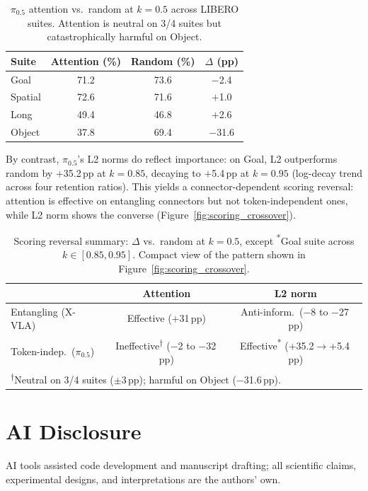 \begin{table}[ht]
\centering
\small
\caption{$\pi_{0.5}$ attention vs.\ random at $k{=}0.5$ across LIBERO suites. Attention is neutral on 3/4 suites but catastrophically harmful on Object.}
\label{tab:pi05_attention_crosssuite}
\begin{tabular}{lccc}
\toprule
Suite & Attention (\%) & Random (\%) & $\Delta$ (pp) \\
\midrule
Goal & 71.2 & 73.6 & $-$2.4 \\
Spatial & 72.6 & 71.6 & $+$1.0 \\
Long & 49.4 & 46.8 & $+$2.6 \\
Object & 37.8 & 69.4 & $-$31.6 \\
\bottomrule
\end{tabular}
\end{table} By contrast, $\pi_{0.5}$'s L2 norms do reflect importance: on Goal, L2 outperforms random by $+$35.2\,pp at $k{=}0.85$, decaying to $+$5.4\,pp at $k{=}0.95$ (log-decay trend across four retention ratios). This yields a connector-dependent scoring reversal: attention is effective on entangling connectors but not token-independent ones, while L2 norm shows the converse (Figure~\ref{fig:scoring_crossover}).

\begin{table}[h]
\centering
\small
\caption{Scoring reversal summary: $\Delta$ vs.\ random at $k{=}0.5$, except \textsuperscript{*}Goal suite across $k \in [0.85, 0.95]$. Compact view of the pattern shown in Figure~\ref{fig:scoring_crossover}.}
\label{tab:scoring_crossover_summary}
\begin{tabular}{lcc}
\toprule
& Attention & L2 norm \\
\midrule
Entangling (X-VLA) & Effective ($+$31\,pp) & Anti-inform.\ ($-$8 to $-$27\,pp) \\
Token-indep.\ ($\pi_{0.5}$) & Ineffective\textsuperscript{$\dagger$} ($-$2 to $-$32\,pp) & Effective\textsuperscript{*} ($+$35.2$\to$$+$5.4\,pp) \\
\bottomrule
\multicolumn{3}{l}{\footnotesize\textsuperscript{$\dagger$}Neutral on 3/4 suites ($\pm$3\,pp); harmful on Object ($-$31.6\,pp).}
\end{tabular}
\end{table}


\section{AI Disclosure}
\label{app:ai_disclosure}

AI tools assisted code development and manuscript drafting; all scientific claims, experimental designs, and interpretations are the authors' own.